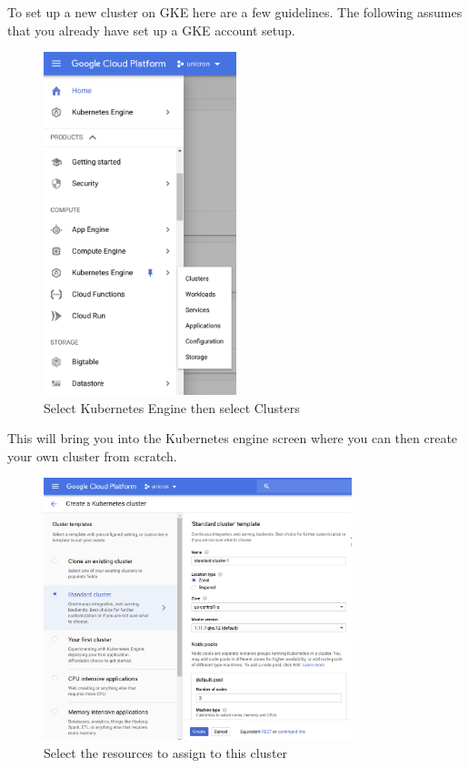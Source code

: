 To set up a new cluster on GKE here are a few guidelines. The following assumes that you already have set up a GKE account setup.

\begin{figure}[!h]
  \centering
    \includegraphics[width=0.5\textwidth]{figures/gke-setup-1.png}
    \caption{Select Kubernetes Engine then select Clusters}
    \label{fig:https-handshake}
\end{figure}

\FloatBarrier

This will bring you into the Kubernetes engine screen where you can then create your own cluster from scratch.

\begin{figure}[!h]
  \centering
    \includegraphics[width=0.8\textwidth]{figures/gke-setup-2.png}
    \caption{Select the resources to assign to this cluster}
    \label{fig:https-handshake}
\end{figure}

